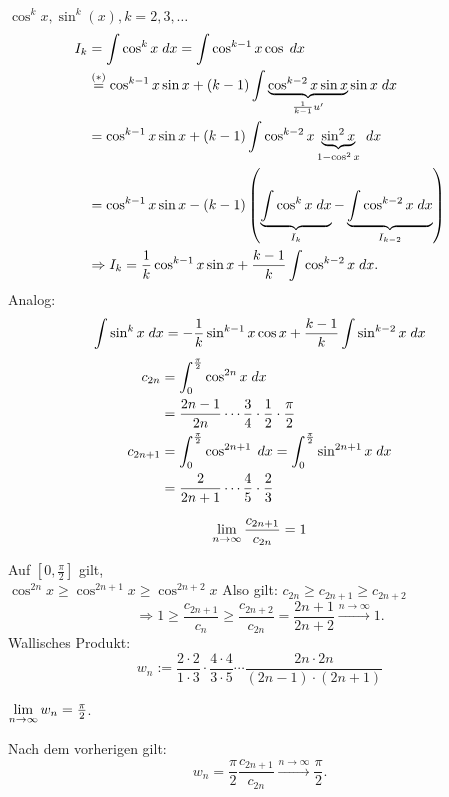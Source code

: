 \documentclass[../ana2u.tex]{subfiles}
\begin{document}
\begin{bsp}
    \( \cos^k x,  \sin^k (x), k = 2,3,\dots \)
    \begin{align*}
        I_k &= \int \cos^k x \dx = \int \cos^{k-1} x \cos \dx \\
        &\overset{(*)}{=} \cos^{k-1} x \sin x + (k-1) 
        \int \underbrace{\cos^{k-2} x \sin x}_{\frac{1}{k-1} u'} 
        \sin x \dx \\        
        &= \cos^{k-1} x \sin x + (k-1)
        \int \cos^{k-2} x 
        \underbrace{\sin^2 x }_{1 - \cos^2 x} \dx \\
        &= \cos^{k-1} x \sin x - (k-1) \left( 
            \underbrace{\int \cos^k x \dx}_{I_k} 
            - \underbrace{\int \cos^{k-2} x \dx}_{I_{k-2}} 
        \right)\\
        &\Rightarrow I_k = \frac{1}{k} \cos^{k-1} x \sin x 
        + \frac{k-1}{k} \int \cos^{k-2} x \dx.
    \end{align*}
    Analog: 
    \[ \int \sin^k x \dx = -\frac{1}{k} \sin^{k-1}x \cos x
    + \frac{k-1}{k} \int \sin^{k-2}x \dx \]
    \begin{align*}
        c_{2n} &= \integral{\cos^{2n}x}{0}{\frac{\pi}{2}} \\
        &= \frac{2n-1}{2n} \cdots \frac{3}{4} 
        \cdot \frac{1}{2} \cdot \frac{\pi}{2} \\
        c_{2n+1} &= \integral{\cos^{2n+1}}{0}{\frac{\pi}{2}}
        = \integral{\sin^{2n+1} x}{0}{\frac{\pi}{2}} \\
        &= \frac{2}{2n+1} \cdots \frac{4}{5} \cdot \frac{2}{3}
    \end{align*}
    \begin{beh}
        \[ \limes{n} \frac{c_{2n+1}}{c_{2n}} = 1 \]
    \end{beh}
    \begin{bew}
        Auf \( [0, \frac{\pi}{2}] \) gilt, \\ 
        \( \cos^{2n} x \geq \cos^{2n+1} x \geq \cos^{2n+2} x \)
        Also gilt: \( c_{2n} \geq c_{2n+1} 
        \geq c_{2n+2} \)
        \[ \Rightarrow 1 \geq \frac{c_{2n+1}}{c_n} 
        \geq \frac{c_{2n+2}}{c_{2n}} 
        = \frac{2n+1}{2n+2} 
        \overset{n\rightarrow \infty}{\longrightarrow} 1. \]
        Wallisches Produkt:
        \[ w_n := \frac{2 \cdot 2}{1 \cdot 3} 
        \cdot \frac{4 \cdot 4}{3 \cdot 5} \cdots
        \frac{2n \cdot 2n}{(2n-1) \cdot (2n+1)} \]        
        \begin{beh}
            \( \limes{n} w_n = \frac{\pi}{2} \).
        \end{beh}
        Nach dem vorherigen gilt:
        \[ w_n = \frac{\pi}{2} 
        \frac{c_{2n+1}}{c_{2n}} 
        \overset{n\rightarrow \infty}{\longrightarrow}
        \frac{\pi}{2}. \]
    \end{bew}    
\end{bsp}
\end{document}
